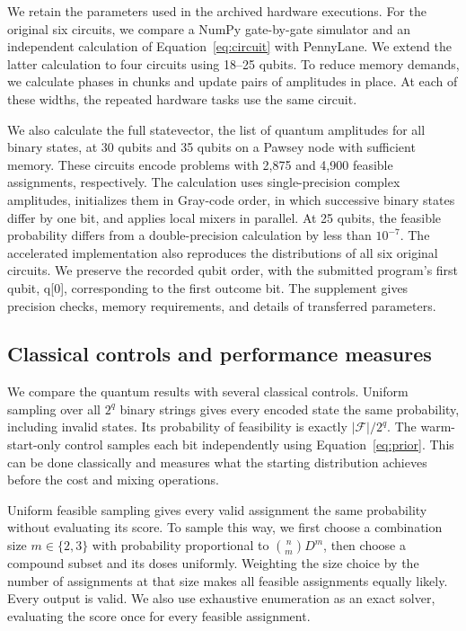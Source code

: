 \documentclass[utf8]{FrontiersinHarvard}
\newcommand{\Fset}{\mathcal{F}}
\begin{document}
We retain the parameters used in the archived hardware executions. For the original six circuits, we compare a NumPy gate-by-gate simulator and an independent calculation of Equation~\ref{eq:circuit} with PennyLane. We extend the latter calculation to four circuits using 18--25 qubits. To reduce memory demands, we calculate phases in chunks and update pairs of amplitudes in place. At each of these widths, the repeated hardware tasks use the same circuit.

We also calculate the full statevector, the list of quantum amplitudes for all binary states, at 30 qubits and 35 qubits on a Pawsey node with sufficient memory. These circuits encode problems with 2,875 and 4,900 feasible assignments, respectively. The calculation uses single-precision complex amplitudes, initializes them in Gray-code order, in which successive binary states differ by one bit, and applies local mixers in parallel. At 25 qubits, the feasible probability differs from a double-precision calculation by less than $10^{-7}$. The accelerated implementation also reproduces the distributions of all six original circuits. We preserve the recorded qubit order, with the submitted program's first qubit, q[0], corresponding to the first outcome bit. The supplement gives precision checks, memory requirements, and details of transferred parameters.

\subsection{Classical controls and performance measures}
We compare the quantum results with several classical controls. Uniform sampling over all $2^q$ binary strings gives every encoded state the same probability, including invalid states. Its probability of feasibility is exactly $|\Fset|/2^q$. The warm-start-only control samples each bit independently using Equation~\ref{eq:prior}. This can be done classically and measures what the starting distribution achieves before the cost and mixing operations.

Uniform feasible sampling gives every valid assignment the same probability without evaluating its score. To sample this way, we first choose a combination size $m\in\{2,3\}$ with probability proportional to $\binom{n}{m}D^m$, then choose a compound subset and its doses uniformly. Weighting the size choice by the number of assignments at that size makes all feasible assignments equally likely. Every output is valid. We also use exhaustive enumeration as an exact solver, evaluating the score once for every feasible assignment.
\end{document}
